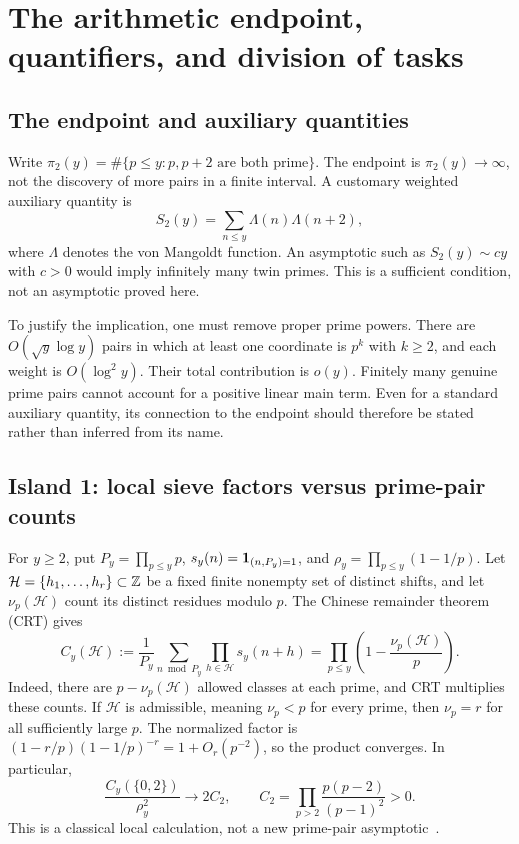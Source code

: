 \section{The arithmetic endpoint, quantifiers, and division of tasks}\label{sec:arithmetic}
\subsection{The endpoint and auxiliary quantities}
Write $\pi_2(y)=\#\{p\le y:p,p+2\text{ are both prime}\}$. The endpoint is $\pi_2(y)\to\infty$, not the discovery of more pairs in a finite interval. A customary weighted auxiliary quantity is
\[
S_2(y)=\sum_{n\le y}\Lambda(n)\Lambda(n+2),
\]
where $\Lambda$ denotes the von Mangoldt function. An asymptotic such as $S_2(y)\sim cy$ with $c>0$ would imply infinitely many twin primes. This is a sufficient condition, not an asymptotic proved here.

To justify the implication, one must remove proper prime powers. There are $O(\sqrt y\log y)$ pairs in which at least one coordinate is $p^k$ with $k\ge2$, and each weight is $O(\log^2y)$. Their total contribution is $o(y)$. Finitely many genuine prime pairs cannot account for a positive linear main term. Even for a standard auxiliary quantity, its connection to the endpoint should therefore be stated rather than inferred from its name.

\subsection{Island 1: local sieve factors versus prime-pair counts}
For $y\ge2$, put $P_y=\prod_{p\le y}p$, $s_y(n)=\mathbf 1_{(n,P_y)=1}$, and $\rho_y=\prod_{p\le y}(1-1/p)$. Let $\mathcal H=\{h_1,\ldots,h_r\}\subset\mathbb Z$ be a fixed finite nonempty set of distinct shifts, and let $\nu_p(\mathcal H)$ count its distinct residues modulo $p$. The Chinese remainder theorem (CRT) gives
\[
C_y(\mathcal H):=\frac1{P_y}\sum_{n\bmod P_y}\prod_{h\in\mathcal H}s_y(n+h)
=\prod_{p\le y}\left(1-\frac{\nu_p(\mathcal H)}p\right).
\]
Indeed, there are $p-\nu_p(\mathcal H)$ allowed classes at each prime, and CRT multiplies these counts. If $\mathcal H$ is admissible, meaning $\nu_p<p$ for every prime, then $\nu_p=r$ for all sufficiently large $p$. The normalized factor is $(1-r/p)(1-1/p)^{-r}=1+O_r(p^{-2})$, so the product converges. In particular,
\[
\frac{C_y(\{0,2\})}{\rho_y^2}\longrightarrow2C_2,\qquad
C_2=\prod_{p>2}\frac{p(p-2)}{(p-1)^2}>0.
\]
This is a classical local calculation, not a new prime-pair asymptotic~\cite{archive1}.

